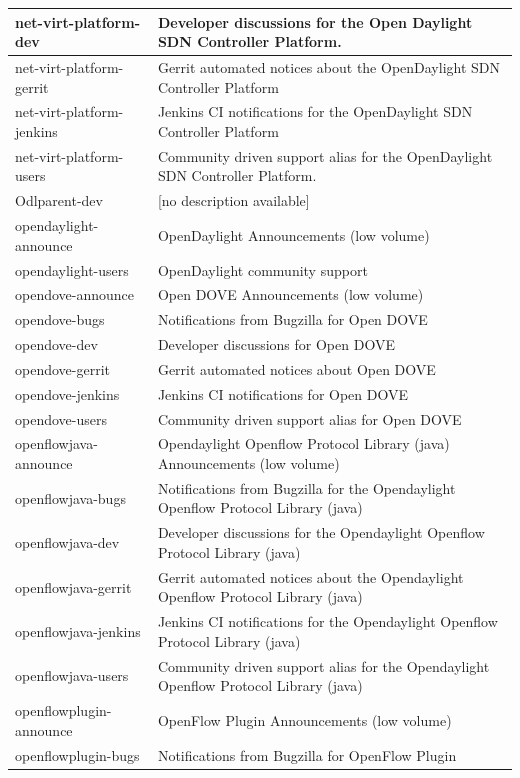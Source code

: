 \documentclass[a4paper, 12pt]{book}
\begin{document}
\begin{longtable}{|p{4cm}|p{10cm}|}
net-virt-platform-dev &	Developer discussions for the Open Daylight SDN Controller Platform. \\ \hline
net-virt-platform-gerrit &	Gerrit automated notices about the OpenDaylight SDN Controller Platform \\ \hline
net-virt-platform-jenkins &	Jenkins CI notifications for the OpenDaylight SDN Controller Platform \\ \hline
net-virt-platform-users &	Community driven support alias for the OpenDaylight SDN Controller Platform. \\ \hline
Odlparent-dev &	[no description available] \\ \hline
opendaylight-announce &	OpenDaylight Announcements (low volume) \\ \hline
opendaylight-users &	OpenDaylight community support \\ \hline
opendove-announce &	Open DOVE Announcements (low volume) \\ \hline
opendove-bugs &	Notifications from Bugzilla for Open DOVE \\ \hline
opendove-dev &	Developer discussions for Open DOVE \\ \hline
opendove-gerrit &	Gerrit automated notices about Open DOVE \\ \hline
opendove-jenkins &	Jenkins CI notifications for Open DOVE \\ \hline
opendove-users &	Community driven support alias for Open DOVE \\ \hline
openflowjava-announce &	Opendaylight Openflow Protocol Library (java) Announcements (low volume) \\ \hline
openflowjava-bugs &	Notifications from Bugzilla for the Opendaylight Openflow Protocol Library (java) \\ \hline
openflowjava-dev &	Developer discussions for the Opendaylight Openflow Protocol Library (java) \\ \hline
openflowjava-gerrit &	Gerrit automated notices about the Opendaylight Openflow Protocol Library (java) \\ \hline
openflowjava-jenkins &	Jenkins CI notifications for the Opendaylight Openflow Protocol Library (java) \\ \hline
openflowjava-users &	Community driven support alias for the Opendaylight Openflow Protocol Library (java) \\ \hline
openflowplugin-announce &	OpenFlow Plugin Announcements (low volume) \\ \hline
openflowplugin-bugs &	Notifications from Bugzilla for OpenFlow Plugin \\ \hline

\end{longtable}
\end{document}
